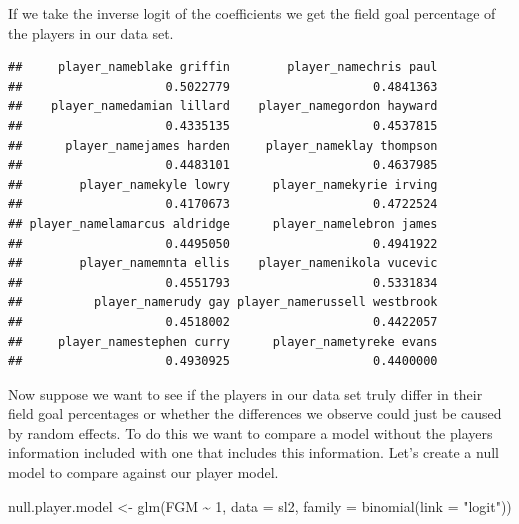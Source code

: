 \documentclass[
]{book}
\newenvironment{Shaded}{\begin{snugshade}}{\end{snugshade}}
\newcommand{\AttributeTok}[1]{\textcolor[rgb]{0.77,0.63,0.00}{#1}}
\newcommand{\DecValTok}[1]{\textcolor[rgb]{0.00,0.00,0.81}{#1}}
\newcommand{\FunctionTok}[1]{\textcolor[rgb]{0.00,0.00,0.00}{#1}}
\newcommand{\NormalTok}[1]{#1}
\newcommand{\OtherTok}[1]{\textcolor[rgb]{0.56,0.35,0.01}{#1}}
\newcommand{\SpecialCharTok}[1]{\textcolor[rgb]{0.00,0.00,0.00}{#1}}
\newcommand{\StringTok}[1]{\textcolor[rgb]{0.31,0.60,0.02}{#1}}
\theoremstyle{definition}
\theoremstyle{definition}
\theoremstyle{definition}
\theoremstyle{definition}
\theoremstyle{remark}
\begin{document}
If we take the inverse logit of the coefficients we get the field goal percentage of the players in our data set.

\begin{Shaded}
\end{Shaded}

\begin{verbatim}
##     player_nameblake griffin        player_namechris paul 
##                    0.5022779                    0.4841363 
##    player_namedamian lillard    player_namegordon hayward 
##                    0.4335135                    0.4537815 
##      player_namejames harden     player_nameklay thompson 
##                    0.4483101                    0.4637985 
##        player_namekyle lowry      player_namekyrie irving 
##                    0.4170673                    0.4722524 
## player_namelamarcus aldridge      player_namelebron james 
##                    0.4495050                    0.4941922 
##        player_namemnta ellis    player_namenikola vucevic 
##                    0.4551793                    0.5331834 
##          player_namerudy gay player_namerussell westbrook 
##                    0.4518002                    0.4422057 
##     player_namestephen curry      player_nametyreke evans 
##                    0.4930925                    0.4400000
\end{verbatim}

Now suppose we want to see if the players in our data set truly differ in their field goal percentages or whether the differences we observe could just be caused by random effects. To do this we want to compare a model without the players information included with one that includes this information. Let's create a null model to compare against our player model.

\begin{Shaded}
\begin{Highlighting}[]
\NormalTok{null.player.model }\OtherTok{\textless{}{-}} \FunctionTok{glm}\NormalTok{(FGM }\SpecialCharTok{\textasciitilde{}} \DecValTok{1}\NormalTok{, }\AttributeTok{data =}\NormalTok{ sl2, }\AttributeTok{family =} \FunctionTok{binomial}\NormalTok{(}\AttributeTok{link =} \StringTok{"logit"}\NormalTok{))}
\end{Highlighting}
\end{Shaded}
\end{document}

